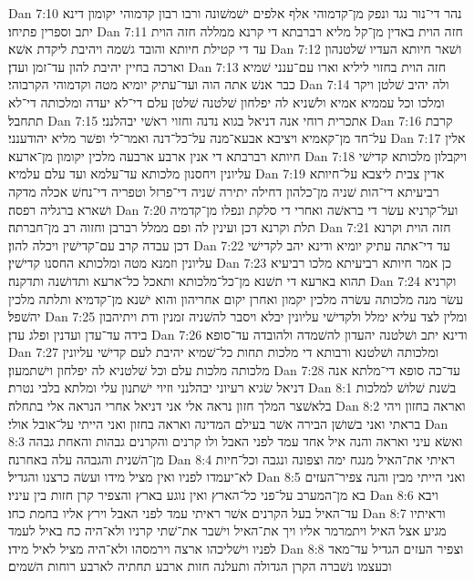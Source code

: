 Dan 7:10  נהר די־נור נגד ונפק מן־קדמוהי אלף אלפים ישׁמשׁונה ורבו רבון קדמוהי יקומון דינא יתב וספרין פתיחו׃
Dan 7:11  חזה הוית באדין מן־קל מליא רברבתא די קרנא ממללה חזה הוית עד די קטילת חיותא והובד גשׁמה ויהיבת ליקדת אשׁא׃
Dan 7:12  ושׁאר חיותא העדיו שׁלטנהון וארכה בחיין יהיבת להון עד־זמן ועדן׃
Dan 7:13  חזה הוית בחזוי ליליא וארו עם־ענני שׁמיא כבר אנשׁ אתה הוה ועד־עתיק יומיא מטה וקדמוהי הקרבוהי׃
Dan 7:14  ולה יהיב שׁלטן ויקר ומלכו וכל עממיא אמיא ולשׁניא לה יפלחון שׁלטנה שׁלטן עלם די־לא יעדה ומלכותה די־לא תתחבל׃
Dan 7:15  אתכרית רוחי אנה דניאל בגוא נדנה וחזוי ראשׁי יבהלנני׃
Dan 7:16  קרבת על־חד מן־קאמיא ויציבא אבעא־מנה על־כל־דנה ואמר־לי ופשׁר מליא יהודענני׃
Dan 7:17  אלין חיותא רברבתא די אנין ארבע ארבעה מלכין יקומון מן־ארעא׃
Dan 7:18  ויקבלון מלכותא קדישׁי עליונין ויחסנון מלכותא עד־עלמא ועד עלם עלמיא׃
Dan 7:19  אדין צבית ליצבא על־חיותא רביעיתא די־הות שׁניה מן־כלהון דחילה יתירה שׁניה די־פרזל וטפריה די־נחשׁ אכלה מדקה ושׁארא ברגליה רפסה׃
Dan 7:20  ועל־קרניא עשׂר די בראשׁה ואחרי די סלקת ונפלו מן־קדמיה תלת וקרנא דכן ועינין לה ופם ממלל רברבן וחזוה רב מן־חברתה׃
Dan 7:21  חזה הוית וקרנא דכן עבדה קרב עם־קדישׁין ויכלה להון׃
Dan 7:22  עד די־אתה עתיק יומיא ודינא יהב לקדישׁי עליונין וזמנא מטה ומלכותא החסנו קדישׁין׃
Dan 7:23  כן אמר חיותא רביעיתא מלכו רביעיא תהוא בארעא די תשׁנא מן־כל־מלכותא ותאכל כל־ארעא ותדושׁנה ותדקנה׃
Dan 7:24  וקרניא עשׂר מנה מלכותה עשׂרה מלכין יקמון ואחרן יקום אחריהון והוא ישׁנא מן־קדמיא ותלתה מלכין יהשׁפל׃
Dan 7:25  ומלין לצד עליא ימלל ולקדישׁי עליונין יבלא ויסבר להשׁניה זמנין ודת ויתיהבון בידה עד־עדן ועדנין ופלג עדן׃
Dan 7:26  ודינא יתב ושׁלטנה יהעדון להשׁמדה ולהובדה עד־סופא׃
Dan 7:27  ומלכותה ושׁלטנא ורבותא די מלכות תחות כל־שׁמיא יהיבת לעם קדישׁי עליונין מלכותה מלכות עלם וכל שׁלטניא לה יפלחון וישׁתמעון׃
Dan 7:28  עד־כה סופא די־מלתא אנה דניאל שׂגיא רעיוני יבהלנני וזיוי ישׁתנון עלי ומלתא בלבי נטרת׃
Dan 8:1  בשׁנת שׁלושׁ למלכות בלאשׁצר המלך חזון נראה אלי אני דניאל אחרי הנראה אלי בתחלה׃
Dan 8:2  ואראה בחזון ויהי בראתי ואני בשׁושׁן הבירה אשׁר בעילם המדינה ואראה בחזון ואני הייתי על־אובל אולי׃
Dan 8:3  ואשׂא עיני ואראה והנה איל אחד עמד לפני האבל ולו קרנים והקרנים גבהות והאחת גבהה מן־השׁנית והגבהה עלה באחרנה׃
Dan 8:4  ראיתי את־האיל מנגח ימה וצפונה ונגבה וכל־חיות לא־יעמדו לפניו ואין מציל מידו ועשׂה כרצנו והגדיל׃
Dan 8:5  ואני הייתי מבין והנה צפיר־העזים בא מן־המערב על־פני כל־הארץ ואין נוגע בארץ והצפיר קרן חזות בין עיניו׃
Dan 8:6  ויבא עד־האיל בעל הקרנים אשׁר ראיתי עמד לפני האבל וירץ אליו בחמת כחו׃
Dan 8:7  וראיתיו מגיע אצל האיל ויתמרמר אליו ויך את־האיל וישׁבר את־שׁתי קרניו ולא־היה כח באיל לעמד לפניו וישׁליכהו ארצה וירמסהו ולא־היה מציל לאיל מידו׃
Dan 8:8  וצפיר העזים הגדיל עד־מאד וכעצמו נשׁברה הקרן הגדולה ותעלנה חזות ארבע תחתיה לארבע רוחות השׁמים׃
